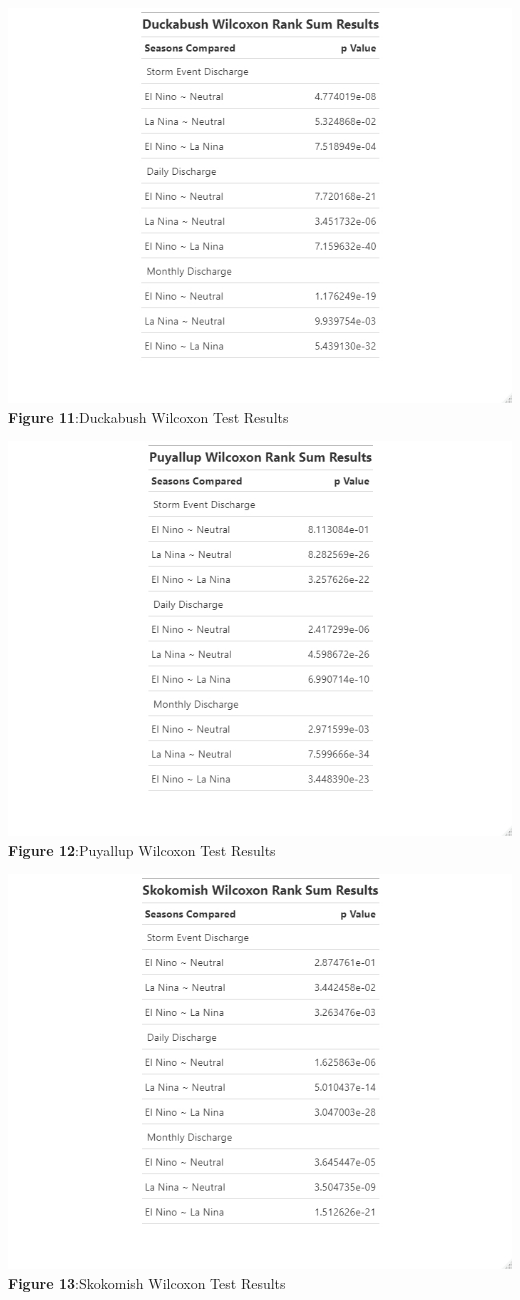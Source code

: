 \documentclass[
  12pt,
]{article}
\begin{document}
\includegraphics{Data/Processed/Tables/DuckWTTable.jpeg} \textbf{Figure
11}:Duckabush Wilcoxon Test Results

\includegraphics{Data/Processed/Tables/PuyallupWTTable.jpeg}
\textbf{Figure 12}:Puyallup Wilcoxon Test Results

\includegraphics{Data/Processed/Tables/SkoWTtable.jpeg} \textbf{Figure
13}:Skokomish Wilcoxon Test Results
\end{document}
